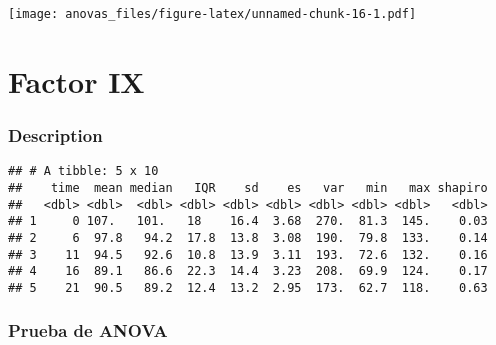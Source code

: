 \documentclass[
]{article}
\begin{document}
\texttt{[image: anovas\_files/figure-latex/unnamed-chunk-16-1.pdf]}

\hypertarget{factor-ix}{%
\section{Factor IX}\label{factor-ix}}

\hypertarget{description-8}{%
\subsubsection{Description}\label{description-8}}

\begin{verbatim}
## # A tibble: 5 x 10
##    time  mean median   IQR    sd    es   var   min   max shapiro
##   <dbl> <dbl>  <dbl> <dbl> <dbl> <dbl> <dbl> <dbl> <dbl>   <dbl>
## 1     0 107.   101.   18    16.4  3.68  270.  81.3  145.    0.03
## 2     6  97.8   94.2  17.8  13.8  3.08  190.  79.8  133.    0.14
## 3    11  94.5   92.6  10.8  13.9  3.11  193.  72.6  132.    0.16
## 4    16  89.1   86.6  22.3  14.4  3.23  208.  69.9  124.    0.17
## 5    21  90.5   89.2  12.4  13.2  2.95  173.  62.7  118.    0.63
\end{verbatim}

\hypertarget{prueba-de-anova-8}{%
\subsubsection{Prueba de ANOVA}\label{prueba-de-anova-8}}
\end{document}
